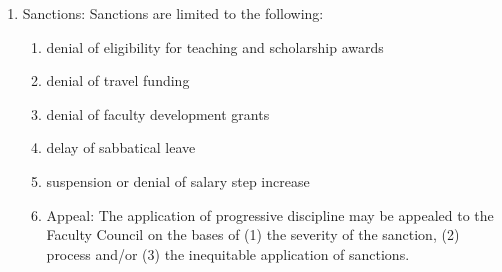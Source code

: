 \documentclass[letterpaper, 11pt]{article}
\begin{document}
\begin{enumerate}[label=\alph*)]
{\begin{enumerate}[label=\arabic*)]
						\end{enumerate}
					}
					\item{Sanctions:
						Sanctions are limited to the following:
						\begin{enumerate}[label=\arabic*)]
							\item{denial of eligibility for teaching and scholarship awards}
							\item{denial of travel funding}
							\item{denial of faculty development grants}
							\item{delay of sabbatical leave}
							\item{suspension or denial of salary step increase}
							\item{Appeal:
								The application of progressive discipline may be appealed to the Faculty Council on the bases of (1) the severity of the sanction, (2) process and/or (3) the inequitable application of sanctions.}
						\end{enumerate}
					}
				\end{enumerate}
\end{document}
